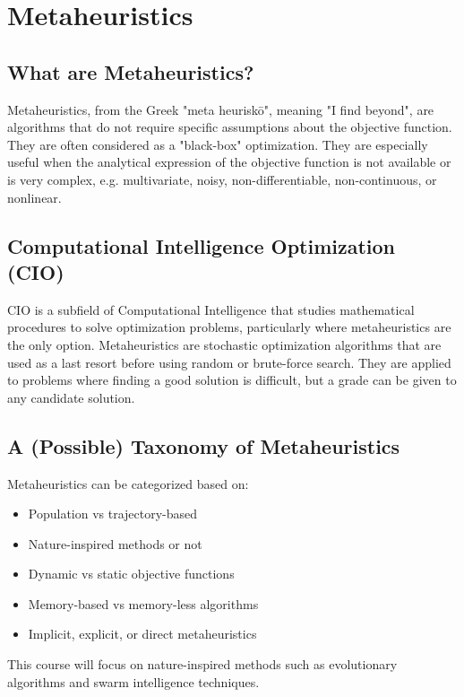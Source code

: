 \section{Metaheuristics}
\subsection*{What are Metaheuristics?}
Metaheuristics, from the Greek "meta heuriskō", meaning "I find beyond", are algorithms that do not require specific assumptions about the objective function. They are often considered as a "black-box" optimization. They are especially useful when the analytical expression of the objective function is not available or is very complex, e.g. multivariate, noisy, non-differentiable, non-continuous, or nonlinear.

\subsection*{Computational Intelligence Optimization (CIO)}
CIO is a subfield of Computational Intelligence that studies mathematical procedures to solve optimization problems, particularly where metaheuristics are the only option. Metaheuristics are stochastic optimization algorithms that are used as a last resort before using random or brute-force search. They are applied to problems where finding a good solution is difficult, but a grade can be given to any candidate solution.

\subsection*{A (Possible) Taxonomy of Metaheuristics}
Metaheuristics can be categorized based on:
\begin{itemize}
    \item Population vs trajectory-based
    \item Nature-inspired methods or not
    \item Dynamic vs static objective functions
    \item Memory-based vs memory-less algorithms
    \item Implicit, explicit, or direct metaheuristics
\end{itemize}
This course will focus on nature-inspired methods such as evolutionary algorithms and swarm intelligence techniques.

